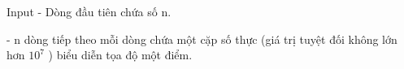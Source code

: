 Input
- Dòng đầu tiên chứa số n.  

   - n dòng tiếp theo mỗi dòng chứa một cặp số thực (giá trị tuyệt đối không lớn hơn $10^{7}$   ) biểu diễn tọa độ một điểm.